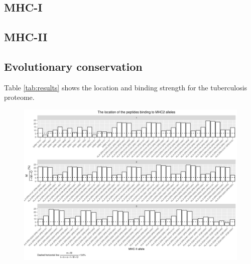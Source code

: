 \documentclass{article}
\begin{document}
\subsection{MHC-I}



\subsection{MHC-II}

\subsection{Evolutionary conservation}

\iffalse
	Table \ref{tab:results} shows the location and binding strength for the
	tuberculosis proteome.

	\begin{figure}[ht]
	  \includegraphics[width=\textwidth]{figure_1.png}
	  \label{fig:1}
	\end{figure}
\end{document}

